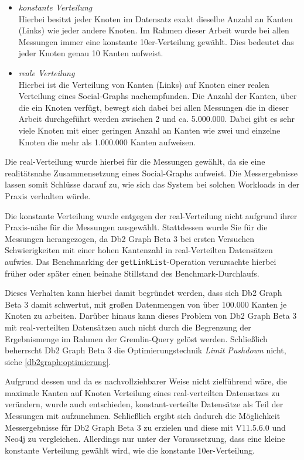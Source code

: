 \begin{itemize}
    \item \textit{konstante Verteilung}\\
    Hierbei besitzt jeder Knoten im Datensatz exakt dieselbe Anzahl an Kanten (Links) wie jeder andere Knoten. Im Rahmen dieser Arbeit wurde bei allen Messungen immer eine konstante 10er-Verteilung gewählt. Dies bedeutet das jeder Knoten genau 10 Kanten aufweist.  
    \item \textit{reale Verteilung}\\
    Hierbei ist die Verteilung von Kanten (Links) auf Knoten einer realen Verteilung eines Social-Graphs nachempfunden. Die Anzahl der Kanten, über die ein Knoten verfügt, bewegt sich dabei bei allen Messungen die in dieser Arbeit durchgeführt werden zwischen 2 und ca. 5.000.000. Dabei gibt es sehr viele Knoten mit einer geringen Anzahl an Kanten wie zwei und einzelne Knoten die mehr als 1.000.000 Kanten aufweisen. 
\end{itemize}

Die real-Verteilung wurde hierbei für die Messungen gewählt, da sie eine realitätsnahe Zusammensetzung eines Social-Graphs aufweist. Die Messergebnisse lassen somit Schlüsse darauf zu, wie sich das System bei solchen Workloads in der Praxis verhalten würde.

Die konstante Verteilung wurde entgegen der real-Verteilung nicht aufgrund ihrer Praxis-nähe für die Messungen ausgewählt. Stattdessen wurde Sie für die Messungen herangezogen, da Db2 Graph Beta 3 bei ersten Versuchen Schwierigkeiten mit einer hohen Kantenzahl in real-Verteilten Datensätzen aufwies. Das Benchmarking der \texttt{getLinkList}-Operation verursachte hierbei früher oder später einen beinahe Stillstand des Benchmark-Durchlaufs. 

Dieses Verhalten kann hierbei damit begründet werden, dass sich Db2 Graph Beta 3 damit schwertut, mit großen Datenmengen von über 100.000 Kanten je Knoten zu arbeiten. Darüber hinaus kann dieses Problem von Db2 Graph Beta 3 mit real-verteilten Datensätzen auch nicht durch die Begrenzung der Ergebnismenge im Rahmen der Gremlin-Query gelöst werden. Schließlich beherrscht Db2 Graph Beta 3 die Optimierungstechnik \textit{Limit Pushdown} nicht, siehe \autoref{db2graph:optimierung}. 

Aufgrund dessen und da es nachvollziehbarer Weise nicht zielführend wäre, die maximale Kanten auf Knoten Verteilung eines real-verteilten Datensatzes zu verändern, wurde auch entschieden, konstant-verteilte Datensätze als Teil der Messungen mit aufzunehmen. Schließlich ergibt sich dadurch die Möglichkeit Messergebnisse für Db2 Graph Beta 3 zu erzielen und diese mit V11.5.6.0 und Neo4j zu vergleichen. Allerdings nur unter der Voraussetzung, dass eine kleine konstante Verteilung gewählt wird, wie die konstante 10er-Verteilung. 

